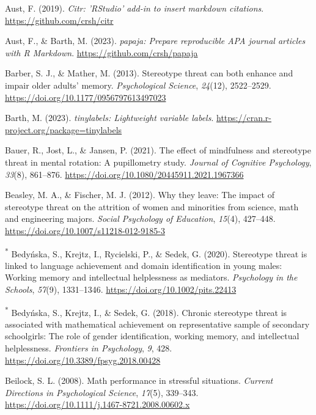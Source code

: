 \documentclass[
  stu, a4paper, 12pt,mask,floatsintext]{apa7}
\newlength{\cslhangindent}
\newenvironment{CSLReferences}[2] %
 {\begin{list}{}{%
  \setlength{\itemindent}{0pt}
  \setlength{\leftmargin}{0pt}
  \setlength{\parsep}{0pt}
  \ifodd #1
   \setlength{\leftmargin}{\cslhangindent}
   \setlength{\itemindent}{-1\cslhangindent}
  \fi
  \setlength{\itemsep}{#2\baselineskip}}}
 {\end{list}}
\begin{document}
\begin{CSLReferences}{1}{0}
Aust, F. (2019). \emph{Citr: 'RStudio' add-in to insert markdown citations}. \url{https://github.com/crsh/citr}

Aust, F., \& Barth, M. (2023). \emph{{papaja}: {Prepare} reproducible {APA} journal articles with {R Markdown}}. \url{https://github.com/crsh/papaja}

Barber, S. J., \& Mather, M. (2013). Stereotype threat can both enhance and impair older adults' memory. \emph{Psychological Science}, \emph{24}(12), 2522--2529. \url{https://doi.org/10.1177/0956797613497023}

Barth, M. (2023). \emph{{tinylabels}: Lightweight variable labels}. \url{https://cran.r-project.org/package=tinylabels}

Bauer, R., Jost, L., \& Jansen, P. (2021). The effect of mindfulness and stereotype threat in mental rotation: A pupillometry study. \emph{Journal of Cognitive Psychology}, \emph{33}(8), 861--876. \url{https://doi.org/10.1080/20445911.2021.1967366}

Beasley, M. A., \& Fischer, M. J. (2012). Why they leave: The impact of stereotype threat on the attrition of women and minorities from science, math and engineering majors. \emph{Social Psychology of Education}, \emph{15}(4), 427--448. \url{https://doi.org/10.1007/s11218-012-9185-3}

\textsuperscript{*} Bedyńska, S., Krejtz, I., Rycielski, P., \& Sedek, G. (2020). Stereotype threat is linked to language achievement and domain identification in young males: {Working} memory and intellectual helplessness as mediators. \emph{Psychology in the Schools}, \emph{57}(9), 1331--1346. \url{https://doi.org/10.1002/pits.22413}

\textsuperscript{*} Bedyńska, S., Krejtz, I., \& Sedek, G. (2018). Chronic stereotype threat is associated with mathematical achievement on representative sample of secondary schoolgirls: {The} role of gender identification, working memory, and intellectual helplessness. \emph{Frontiers in Psychology}, \emph{9}, 428. \url{https://doi.org/10.3389/fpsyg.2018.00428}

Beilock, S. L. (2008). Math performance in stressful situations. \emph{Current Directions in Psychological Science}, \emph{17}(5), 339--343. \url{https://doi.org/10.1111/j.1467-8721.2008.00602.x}


\end{CSLReferences}
\end{document}
